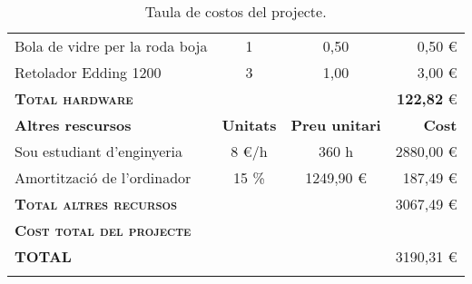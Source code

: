 \begin{longtable}{@{\extracolsep{\fill}} lccr}
	Bola de vidre per la roda boja & 1 & 0,50 & 0,50 \euro \\
	Retolador Edding 1200 & 3 & 1,00 & 3,00 \euro \\
	\midrule
	\textsc{\textbf{Total hardware}}         && & \textbf{122,82} \euro\\
	\toprule
	\textbf{Altres rescursos} & \textbf{Unitats} & \textbf{Preu unitari} & \textbf{Cost} \\
	\midrule
	Sou estudiant d'enginyeria & 8 \euro/h & 360 h & 2880,00 \euro \\
	Amortització de l'ordinador & 15 \% & 1249,90 \euro & 187,49 \euro \\
	\midrule
	\textsc{\textbf{Total altres recursos}}  & & & 3067,49 \euro\\
	\toprule
	\toprule
	\textbf{\textsc{Cost total del projecte}} & \\
	\toprule
	\toprule
	\textbf{TOTAL} &&& 3190,31 \euro \\
	\bottomrule    
	\caption{Taula de costos del projecte.}            
\end{longtable}